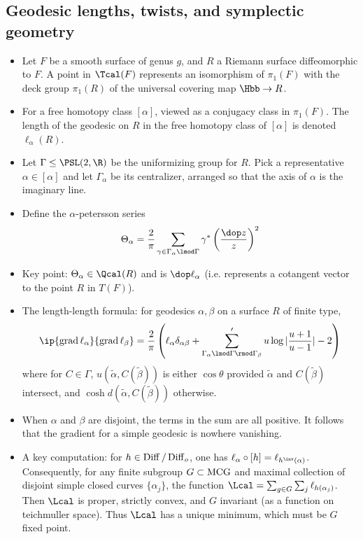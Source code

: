 \documentclass[11pt]{amsart}
\begin{document}
\subsection{Geodesic lengths, twists, and symplectic geometry}
\begin{itemize}
  \item Let $F$ be a smooth surface of genus $g$, and $R$ a Riemann surface diffeomorphic to $F$.  A point in $\Tcal(F)$ represents an isomorphism of $\pi_1(F)$ with the deck group $\pi_1(R)$ of the universal covering map $\Hbb \to R$. 
  \item For a free homotopy class $[\alpha]$, viewed as a conjugacy class in $\pi_1(F)$. The length of the geodesic on $R$ in the free homotopy class of $[\alpha]$ is denoted $\ell_\alpha (R)$. 
  \item Let $\Gamma  \leq \PSL(2,\R)$ be the uniformizing group for $R$. Pick a representative $\alpha \in [\alpha]$ and let $\Gamma_\alpha$ be its centralizer, arranged so that the axis of $\alpha$ is the imaginary line.
  \item Define the $\alpha$-petersson series  \[\Theta_\alpha = \frac{2}{\pi} \sum _{ \gamma \in \Gamma_\alpha \lmod \Gamma} \gamma^* \lp \frac{\dop z}{z}\rp^2\]
  \item Key point: $\Theta_\alpha  \in \Qcal(R)$ and is $\dop \ell_\alpha$ (i.e. represents a cotangent vector to the point $R$ in $T(F)$).
  \item The length-length formula: for geodesics $\alpha,\beta$ on a surface $R$ of finite type, \[ \ip{\grad \ell_\alpha}{\grad \ell_\beta} = \frac{2}{\pi} \lp \ell_\alpha \delta_{\alpha \beta} +\sum_{\Gamma_\alpha \lmod \Gamma \rmod \Gamma_\beta }' u \log{\vert\frac{u+1}{u-1}\vert } -2 \rp \] where for $C\in \Gamma$,  $u(\tilde{\alpha}, C(\tilde{\beta}))$ is either $\cos \theta$ provided $\tilde{\alpha}$ and $C(\tilde{\beta})$ intersect, and $\cosh d(\tilde{\alpha}, C(\tilde{\beta}))$ otherwise. 
  \item When $\alpha$ and $\beta$ are disjoint, the terms in the sum are all positive. It follows that the gradient for a simple geodesic is nowhere vanishing.
  \item A key computation: for $h \in \operatorname{Diff}/\operatorname{Diff}_o$, one has $\ell_\alpha \circ [h] = \ell_{h^\inv (\alpha)}$. Consequently, for any finite subgroup $G\subset \operatorname{MCG}$ and maximal collection of disjoint simple closed curves $\{ \alpha_j\}$, the function $\Lcal= \sum_{g\in G} \sum_{j} \ell_{h(\alpha_j)}$. Then $\Lcal$ is proper, strictly convex, and $G$ invariant (as a function on teichmuller space). Thus $\Lcal$ has a unique minimum, which must be $G$ fixed point. 
\end{itemize}
\end{document}
